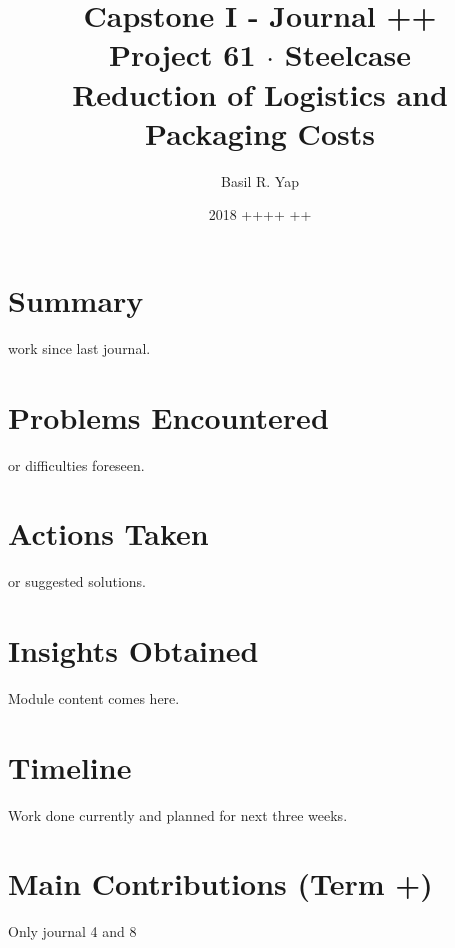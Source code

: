 \documentclass[a4paper, fleqn]{article}
\begin{document}
\title{Capstone I - Journal ++ \\ Project 61 $\cdot$  Steelcase \\ Reduction of Logistics and Packaging Costs}
\author{Basil R. Yap}
\date{2018 ++++ ++}
\maketitle

\section{Summary}

work since last journal.

\section{Problems Encountered}

or difficulties foreseen.

\section{Actions Taken}

or suggested solutions.

\section{Insights Obtained}

Module content comes here.

\section{Timeline}

Work done currently and planned for next three weeks.

\section{Main Contributions (Term +)}

Only journal 4 and 8
\end{document}
